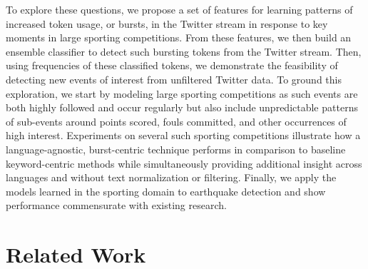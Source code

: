 \documentclass{acm_proc_article-sp}
\begin{document}
To explore these questions, we propose a set of features for learning patterns of increased token usage, or bursts, in the Twitter stream in response to key moments in large sporting competitions.
From these features, we then build an ensemble classifier to detect such bursting tokens from the Twitter stream.
Then, using frequencies of these classified tokens, we demonstrate the feasibility of detecting new events of interest from unfiltered Twitter data.
To ground this exploration, we start by modeling large sporting competitions as such events are both highly followed and occur regularly but also include unpredictable patterns of sub-events around points scored, fouls committed, and other occurrences of high interest.
Experiments on several such sporting competitions illustrate how a language-agnostic, burst-centric technique performs in comparison to baseline keyword-centric methods while simultaneously providing additional insight across languages and without text normalization or filtering.
Finally, we apply the models learned in the sporting domain to earthquake detection and show performance commensurate with existing research.


\section{Related Work}
\label{sect:relatedWork}
\end{document}
